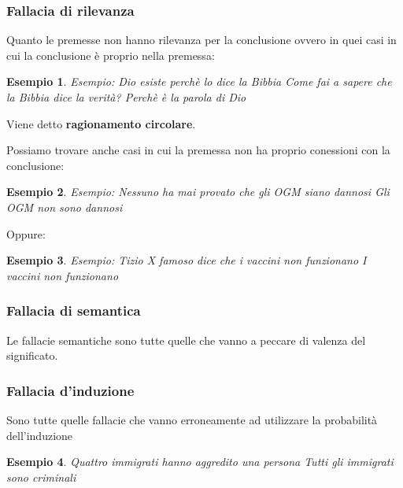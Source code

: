 \documentclass[../main.tex, class=article, 12pt]{subfiles}
\newtheorem{exmp}{Esempio}[section]
\theoremstyle{definition}
\begin{document}
\subsubsection{Fallacia di rilevanza}
Quanto le premesse non hanno rilevanza per la conclusione ovvero in quei casi in cui la conclusione è proprio nella premessa:
\begin{exmp}
        Esempio: \newline
        Dio esiste perchè lo dice la Bibbia \newline
        Come fai a sapere che la Bibbia dice la verità? \newline
        Perchè è la parola di Dio \newline
\end{exmp}
Viene detto \textbf{ragionamento circolare}. \par

Possiamo trovare anche casi in cui la premessa non ha proprio conessioni con la conclusione:
\begin{exmp}
        Esempio: \newline
        Nessuno ha mai provato che gli OGM siano dannosi \newline
        Gli OGM non sono dannosi \newline
\end{exmp}
Oppure:
\begin{exmp}
        Esempio: \newline
        Tizio X famoso dice che i vaccini non funzionano\newline
        I vaccini non funzionano \newline
\end{exmp}



\subsubsection{Fallacia di semantica}
Le fallacie semantiche sono tutte quelle che vanno a peccare di valenza del significato. 



\subsubsection{Fallacia d'induzione}
Sono tutte quelle fallacie che vanno erroneamente ad utilizzare la probabilità dell'induzione
\begin{exmp}
 
        Quattro immigrati hanno aggredito una persona \newline
        Tutti gli immigrati sono criminali \newline
\end{exmp}
\end{document}
